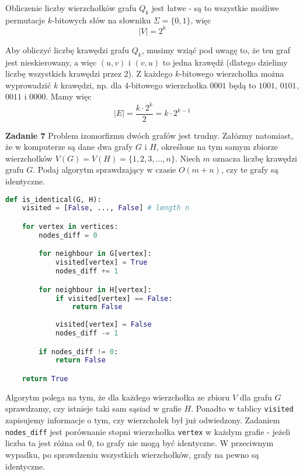 \documentclass[a4paper,12pt]{article}
\newcommand{\abs}[1]{\left| #1 \right|}					%
\newcommand{\code}[1]{\lstinline[style=code]{#1}} %
\begin{document}
\noindent Obliczenie liczby wierzchołków grafu $Q_k$ jest łatwe - są to wszystkie możliwe
permutacje $k$-bitowych słów na słowniku $\Sigma = \{ 0, 1\}$, więc 
\[ 
    \abs{V} = 2^k
\]

\noindent Aby obliczyć liczbę krawędzi grafu $Q_k$, musimy wziąć pod uwagę to, że
ten graf jest nieskierowany, a więc $(u, v)$ i $(v, u)$ to jedna krawędź (dlatego
dzielimy liczbę wszystkich krawędzi przez $2$). Z każdego $k$-bitowego wierzchołka
można wyprowadzić $k$ krawędzi, np. dla $4$-bitowego wierzchołka $0001$ będą to 
$1001$, $0101$, $0011$ i $0000$. Mamy więc 
\[
    \abs{E} = \frac{k \cdot 2^k}{2} = k \cdot 2^{k-1}
\]

\noindent \newline \textbf{Zadanie 7} \newline
Problem izomorfizmu dwóch grafów jest trudny. Załózmy natomiast, że w komputerze
są dane dwa grafy $G$ i $H$, określone na tym samym zbiorze wierzchołków
$V(G) = V(H) = \{ 1, 2, 3, \ldots, n \}$. Niech $m$ oznacza liczbę krawędzi grafu
$G$. Podaj algorytm sprawdzający w czasie $O(m+n)$, czy te grafy są identyczne.

\begin{lstlisting}[style=code, language=python]
def is_identical(G, H):
    visited = [False, ..., False] # length n

    for vertex in vertices:
        nodes_diff = 0

        for neighbour in G[vertex]:
            visited[vertex] = True
            nodes_diff += 1

        for neighbour in H[vertex]:
            if visited[vertex] == False:
                return False
            
            visited[vertex] = False
            nodes_diff -= 1

        if nodes_diff != 0:
            return False

    return True
\end{lstlisting}

\noindent Algorytm polega na tym, że dla każdego wierzchołka ze zbioru $V$ dla
grafu $G$ sprawdzamy, czy istnieje taki sam sąsiad w grafie $H$. Ponadto w tablicy
\code{visited} zapisujemy informacje o tym, czy wierzchołek był już odwiedzony.
Zadaniem \code{nodes_diff} jest porównanie stopni wierzchołka \code{vertex} 
w każdym grafie - jeżeli liczba ta jest różna od $0$, to grafy nie mogą być 
identyczne. W przeciwnym wypadku, po sprawdzeniu wszystkich wierzchołków, grafy
na pewno są identyczne.
\end{document}
